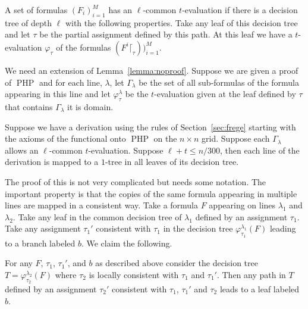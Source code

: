 \documentclass{article}\usepackage[a4paper,margin=20mm]{geometry}
\DeclareMathOperator{\PHP}{PHP}
\begin{document}
\begin{definition}
A set of formulas $(F_i)_{i=1}^M$ has an $\ell$-common $t$-evaluation if
there is a decision tree of depth $\ell$ with
the following properties.  Take any leaf of this decision
tree and let $\tau$ be the partial assignment defined by
this path.  At this leaf we have a $t$-evaluation
$\varphi_{\tau}$ of the formulas $(F^i\lceil_{\tau}))_{i=1}^M$.
\end{definition}

We need an extension of Lemma~\ref{lemma:noproof}.
Suppose we are given a proof of $\PHP$ and for each line,
$\lambda$, let $\Gamma_\lambda$ be the set of all sub-formulas
of the formula appearing in this line and let $\varphi_{\tau}^{\lambda}$
be the $t$-evaluation given at the leaf defined by 
$\tau$ that contains $\Gamma_\lambda$ it is domain.

\begin{lemma}\label{lemma:noproofm}
Suppose we have a derivation using the rules
of Section~\ref{sec:frege} starting with the
axioms of the functional onto $\PHP$ on the $n \times n$ grid.
Suppose each $\Gamma_\lambda$ allows an $\ell$-common $t$-evaluation.
Suppose $\ell +t \leq n/300$, then
each line of the derivation is mapped to a $1$-tree
in all leaves of its decision tree.
\end{lemma}

The proof of this is not very complicated but needs some
notation.  The important property is
that the copies of the same formula appearing in multiple lines
are mapped in a consistent way.  Take a formula
$F$ appearing on lines $\lambda_1$ and $\lambda_2$.
Take any leaf in the common decision tree of 
$\lambda_1$ defined by an assignment $\tau_1$.
Take any assignment $\tau_1'$ consistent with $\tau_1$ in
the decision tree $\varphi_{\tau_1}^{\lambda_1} (F)$ leading
to a branch labeled $b$.  We claim the following.

\begin{lemma}\label{lemma:consteval}
For any $F$, $\tau_1$, $\tau_1'$, and $b$ as described above consider the
decision tree $T=\varphi_{\tau_2}^{\lambda_2} (F)$ 
where $\tau_2$ is locally consistent with $\tau_1$
and $\tau_1'$.  Then any path in $T$ defined
by an assignment $\tau_2'$ consistent with
$\tau_1$, $\tau_1'$ and $\tau_2$ leads to
a leaf labeled $b$.
\end{lemma}
\end{document}
